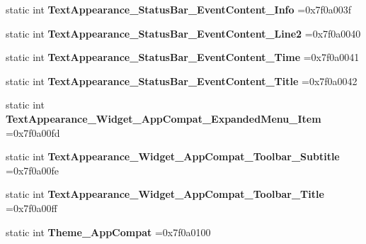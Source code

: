 \begin{DoxyCompactItemize}
static int {\bfseries Text\+Appearance\+\_\+\+Status\+Bar\+\_\+\+Event\+Content\+\_\+\+Info} =0x7f0a003f
\item 
\mbox{\label{classandroid_1_1support_1_1v7_1_1appcompat_1_1R_1_1style_aca9b1480b02a9b6e88888f22678d0eca}} 
static int {\bfseries Text\+Appearance\+\_\+\+Status\+Bar\+\_\+\+Event\+Content\+\_\+\+Line2} =0x7f0a0040
\item 
\mbox{\label{classandroid_1_1support_1_1v7_1_1appcompat_1_1R_1_1style_a1fa774e9c30fdf183d9b10ac7510babf}} 
static int {\bfseries Text\+Appearance\+\_\+\+Status\+Bar\+\_\+\+Event\+Content\+\_\+\+Time} =0x7f0a0041
\item 
\mbox{\label{classandroid_1_1support_1_1v7_1_1appcompat_1_1R_1_1style_a205e2e703bab5a4c8be56acd38e59caf}} 
static int {\bfseries Text\+Appearance\+\_\+\+Status\+Bar\+\_\+\+Event\+Content\+\_\+\+Title} =0x7f0a0042
\item 
\mbox{\label{classandroid_1_1support_1_1v7_1_1appcompat_1_1R_1_1style_a252d3b93053f716244ca2bae7467f505}} 
static int {\bfseries Text\+Appearance\+\_\+\+Widget\+\_\+\+App\+Compat\+\_\+\+Expanded\+Menu\+\_\+\+Item} =0x7f0a00fd
\item 
\mbox{\label{classandroid_1_1support_1_1v7_1_1appcompat_1_1R_1_1style_a5a5719010eb1430e7d62d07e9d464b32}} 
static int {\bfseries Text\+Appearance\+\_\+\+Widget\+\_\+\+App\+Compat\+\_\+\+Toolbar\+\_\+\+Subtitle} =0x7f0a00fe
\item 
\mbox{\label{classandroid_1_1support_1_1v7_1_1appcompat_1_1R_1_1style_a91679a42d65951ec83c57816f9d56da1}} 
static int {\bfseries Text\+Appearance\+\_\+\+Widget\+\_\+\+App\+Compat\+\_\+\+Toolbar\+\_\+\+Title} =0x7f0a00ff
\item 
\mbox{\label{classandroid_1_1support_1_1v7_1_1appcompat_1_1R_1_1style_a0836068563a5cb0549395295bf6219a1}} 
static int {\bfseries Theme\+\_\+\+App\+Compat} =0x7f0a0100

\end{DoxyCompactItemize}
